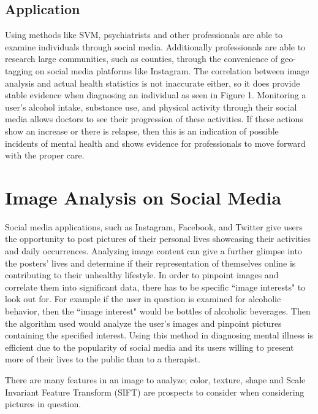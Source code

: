 \documentclass[11pt,technote,twocolumn]{IEEEtran}
\begin{document}
\subsection{Application}

Using methods like SVM, psychiatrists and other professionals are able to examine individuals through social media. Additionally professionals are able to research large communities, such as counties, through the convenience of geo-tagging on social media platforms like Instagram. The correlation between image analysis and actual health statistics is not inaccurate either, so it does provide stable evidence when diagnosing an individual as seen in Figure 1. Monitoring a user's alcohol intake, substance use, and physical activity through their social media allows doctors to see their progression of these activities. If these actions show an increase or there is relapse, then this is an indication of possible incidents of mental health and shows evidence for professionals to move forward with the proper care. 

\section{Image Analysis on Social Media}
Social media applications, such as Instagram, Facebook, and Twitter give users the opportunity to post pictures of their personal lives showcasing their activities and daily occurrences. Analyzing image content can give a further glimpse into the posters' lives and determine if their representation of themselves online is contributing to their unhealthy lifestyle. In order to pinpoint images and correlate them into significant data, there has to be specific ``image interests" to look out for. For example if the user in question is examined for alcoholic behavior, then the ``image interest" would be bottles of alcoholic beverages. Then the algorithm used would analyze the user's images and pinpoint pictures containing the specified interest. Using this method in diagnosing mental illness is efficient due to the popularity of social media and its users willing to present more of their lives to the public than to a therapist.
\par
There are many features in an image to analyze; color, texture, shape and Scale Invariant Feature Transform (SIFT) are prospects to consider when considering pictures in question.
\end{document}
